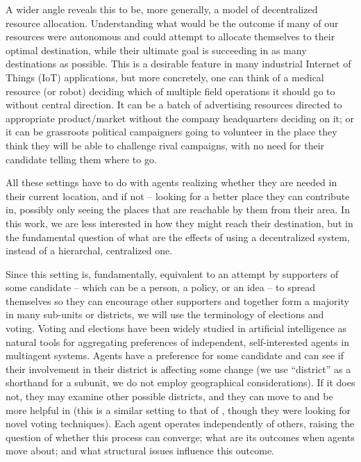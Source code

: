\documentclass[letterpaper]{article} %
\begin{document}
A wider angle reveals this to be, more generally, a model of decentralized resource allocation.
Understanding what would be the outcome if many of our resources were autonomous and could attempt to allocate themselves to their optimal destination, while their ultimate goal is succeeding in as many destinations as possible.
This is a desirable feature in many industrial Internet of Things (IoT) applications, but more concretely, one can think of a medical resource (or robot) deciding which of multiple field operations it should go to without central direction. It can be a batch of advertising resources directed to appropriate product/market without the company headquarters deciding on it; or it can be grassroots political campaigners going to volunteer in the place they think they will be able to challenge rival campaigns, with no need for their candidate telling them where to go.

All these settings have to do with agents realizing whether they are needed in their current location, and if not -- looking for a better place they can contribute in, possibly only seeing the places that are reachable by them from their area. In this work, we are less interested in how they might reach their destination, but in the fundamental question of what are the effects of using a decentralized system, instead of a hierarchal, centralized one.

Since this setting is, fundamentally, equivalent to an attempt by supporters of some candidate -- which can be a person, a policy, or an idea -- to spread themselves so they can encourage other supporters and together form a majority in many sub-units or districts, we will use the terminology of elections and voting.
Voting and elections have been widely studied in artificial intelligence as natural tools for aggregating preferences of independent, self-interested agents in multiagent systems.
Agents have a preference for some candidate and can see if their involvement in their district is affecting some change (we use ``district'' as a shorthand for a subunit, we do not employ geographical considerations). If it does not, they may examine other possible districts, and they can move to and be more helpful in (this is a similar setting to that of \cite{BM12}, though they were looking for novel voting techniques). Each agent operates independently of others, raising the question of whether this process can converge; what are its outcomes when agents move about; and what structural issues influence this outcome.
\end{document}
